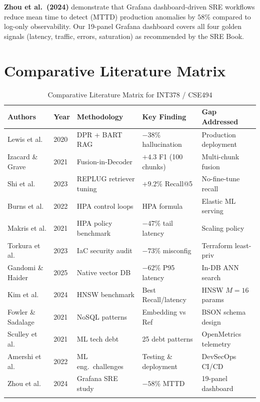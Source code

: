 \documentclass[12pt,a4paper]{report}
\begin{document}
\textbf{Zhou et al.\ (2024)} \cite{zhou2024grafana} demonstrate that
Grafana dashboard-driven SRE workflows reduce mean time to detect (MTTD)
production anomalies by $58\%$ compared to log-only observability. Our
19-panel Grafana dashboard covers all four golden signals (latency, traffic,
errors, saturation) as recommended by the SRE Book.

\section{Comparative Literature Matrix}

\begin{longtable}{@{}p{2.4cm}p{1.0cm}p{3.5cm}p{3.0cm}p{3.2cm}@{}}
  \toprule
  \textbf{Authors} & \textbf{Year} & \textbf{Methodology} &
  \textbf{Key Finding} & \textbf{Gap Addressed} \\
  \midrule
  Lewis et al. & 2020 & DPR + BART RAG & $-38\%$ hallucination &
    Production deployment \\[0.2cm]
  Izacard \& Grave & 2021 & Fusion-in-Decoder & $+4.3$ F1 (100 chunks) &
    Multi-chunk fusion \\[0.2cm]
  Shi et al. & 2023 & REPLUG retriever tuning & $+9.2\%$ Recall@5 &
    No-fine-tune recall \\[0.2cm]
  Burns et al. & 2022 & HPA control loops & HPA formula & Elastic ML serving \\[0.2cm]
  Makris et al. & 2021 & HPA policy benchmark & $-47\%$ tail latency & Scaling policy \\[0.2cm]
  Torkura et al. & 2023 & IaC security audit & $-73\%$ misconfig & Terraform least-priv \\[0.2cm]
  Gandomi \& Haider & 2025 & Native vector DB & $-62\%$ P95 latency & In-DB ANN search \\[0.2cm]
  Kim et al. & 2024 & HNSW benchmark & Best Recall/latency & HNSW $M=16$ params \\[0.2cm]
  Fowler \& Sadalage & 2021 & NoSQL patterns & Embedding vs Ref & BSON schema design \\[0.2cm]
  Sculley et al. & 2021 & ML tech debt & 25 debt patterns & OpenMetrics telemetry \\[0.2cm]
  Amershi et al. & 2022 & ML eng.\ challenges & Testing \& deployment & DevSecOps CI/CD \\[0.2cm]
  Zhou et al. & 2024 & Grafana SRE study & $-58\%$ MTTD & 19-panel dashboard \\
  \bottomrule
  \caption{Comparative Literature Matrix for INT378 / CSE494}
  \label{tab:lit_matrix}
\end{longtable}
\newpage
\end{document}
